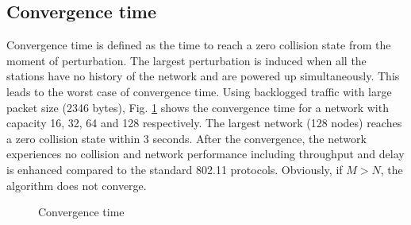 \documentclass{acm_proc_article-sp}
\begin{document}
\subsection{Convergence time}
Convergence time is defined as the time to reach a zero collision state from the moment of perturbation. The largest perturbation
is induced when all the stations have no history of the network and are powered up simultaneously. This leads to the worst case
of convergence time. Using backlogged traffic with large packet size (2346 bytes), Fig. \ref{fig.convergencetime} shows the convergence
time for a network with capacity 16, 32, 64 and 128 respectively. The largest network (128 nodes) reaches a zero collision state
within 3 seconds. After the convergence, the network experiences no collision and network performance including throughput and delay is
enhanced compared to the standard 802.11 protocols. Obviously, if $M > N$, the algorithm does not converge.
\begin{figure}[ht]
  \begin{center}
  \caption{Convergence time}\label{fig.convergencetime}
  \end{center}
\vspace{-0.2in}
\end{figure}
\end{document}
